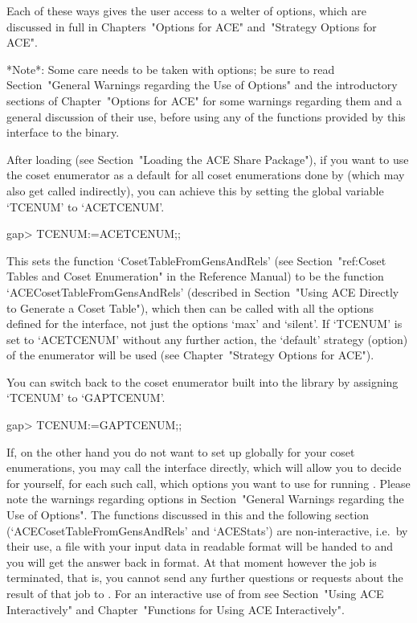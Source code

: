 \endlist

Each of these ways gives the user access to a welter of options, which
are discussed in full  in  Chapters~"Options  for  ACE"  and~"Strategy
Options for ACE".

*Note*: Some care needs to be taken with  options;  be  sure  to  read
Section~"General Warnings  regarding  the  Use  of  Options"  and  the
introductory sections of Chapter~"Options for ACE" for  some  warnings
regarding them and a general discussion of their use, before using any
of the functions provided by this interface to the {\ACE} binary.


After loading  {\ACE}   (see Section~"Loading the ACE Share Package"),
if you  want to use the {\ACE}  coset enumerator as a  default for all
coset  enumerations  done  by   {\GAP}  (which  may  also  get  called
indirectly),  you can  achieve  this by  setting  the global  variable
`TCENUM' to `ACETCENUM'.

\beginexample
gap> TCENUM:=ACETCENUM;;
\endexample

This    sets    the    function    `CosetTableFromGensAndRels'    (see
Section~"ref:Coset  Tables  and  Coset  Enumeration"  in  the   {\GAP}
Reference Manual) to be  the  function  `ACECosetTableFromGensAndRels'
(described in Section~"Using ACE Directly to Generate a Coset Table"),
which then can be called with all the options defined for  the  {\ACE}
interface, not just the options `max' and `silent'. If `TCENUM' is set
to `ACETCENUM' without any  further  action,  the  `default'  strategy
(option) of the {\ACE} enumerator will be used (see  Chapter~"Strategy
Options for ACE").

You can switch back to the coset  enumerator  built  into  the  {\GAP}
library by assigning `TCENUM' to `GAPTCENUM'.

\beginexample
gap> TCENUM:=GAPTCENUM;;
\endexample


If, on the other hand you do not want to set up  {\ACE}  globally  for
your coset enumerations, you may call the {\ACE}  interface  directly,
which will allow you to decide for yourself, for each such call, which
options you want to use for running {\ACE}. Please note  the  warnings
regarding options in Section~"General Warnings regarding  the  Use  of
Options". The functions discussed in this and  the  following  section
(`ACECosetTableFromGensAndRels' and `ACEStats')  are  non-interactive,
i.e.~by their use, a file with your  input  data  in  {\ACE}  readable
format will be handed to {\ACE} and you will get the  answer  back  in
{\GAP} format. At that moment however the {\ACE}  job  is  terminated,
that is, you cannot send any further questions or requests  about  the
result of that job to {\ACE}. For an interactive use  of  {\ACE}  from
{\GAP} see Section~"Using ACE  Interactively"  and  Chapter~"Functions
for Using ACE Interactively".


